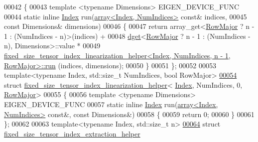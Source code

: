 \begin{DoxyCode}
00042 \{
00043   \textcolor{keyword}{template} <\textcolor{keyword}{typename} Dimensions> EIGEN\_DEVICE\_FUNC
00044   \textcolor{keyword}{static} \textcolor{keyword}{inline} \hyperlink{namespace_eigen_a62e77e0933482dafde8fe197d9a2cfde}{Index} run(\hyperlink{class_eigen_1_1array}{array<Index, NumIndices>} \textcolor{keyword}{const}& indices,
00045                           \textcolor{keyword}{const} Dimensions& dimensions)
00046   \{
00047     \textcolor{keywordflow}{return} array\_get<\hyperlink{group__enums_ggaacded1a18ae58b0f554751f6cdf9eb13acfcde9cd8677c5f7caf6bd603666aae3}{RowMajor} ? n - 1 : (NumIndices - n)>(indices) +
00048         \hyperlink{struct_eigen_1_1internal_1_1dget}{dget}<\hyperlink{group__enums_ggaacded1a18ae58b0f554751f6cdf9eb13acfcde9cd8677c5f7caf6bd603666aae3}{RowMajor} ? n - 1 : (NumIndices - n), Dimensions>::value *
00049         
      \hyperlink{struct_eigen_1_1internal_1_1fixed__size__tensor__index__linearization__helper}{fixed\_size\_tensor\_index\_linearization\_helper<Index, NumIndices, n - 1, RowMajor>::run}
      (indices, dimensions);
00050   \}
00051 \};
00052 
00053 \textcolor{keyword}{template}<\textcolor{keyword}{typename} Index, std::\textcolor{keywordtype}{size\_t} NumIndices, \textcolor{keywordtype}{bool} RowMajor>
\hyperlink{struct_eigen_1_1internal_1_1fixed__size__tensor__index__linearization__helper_3_01_index_00_01_n48be286421c8b3a07bb17ebfc895db83}{00054} \textcolor{keyword}{struct }\hyperlink{struct_eigen_1_1internal_1_1fixed__size__tensor__index__linearization__helper}{fixed\_size\_tensor\_index\_linearization\_helper}<
      \hyperlink{namespace_eigen_a62e77e0933482dafde8fe197d9a2cfde}{Index}, NumIndices, 0, \hyperlink{group__enums_ggaacded1a18ae58b0f554751f6cdf9eb13acfcde9cd8677c5f7caf6bd603666aae3}{RowMajor}>
00055 \{
00056   \textcolor{keyword}{template} <\textcolor{keyword}{typename} Dimensions> EIGEN\_DEVICE\_FUNC
00057   \textcolor{keyword}{static} \textcolor{keyword}{inline} \hyperlink{namespace_eigen_a62e77e0933482dafde8fe197d9a2cfde}{Index} run(\hyperlink{class_eigen_1_1array}{array<Index, NumIndices>} \textcolor{keyword}{const}&, \textcolor{keyword}{const} Dimensions&)
00058   \{
00059     \textcolor{keywordflow}{return} 0;
00060   \}
00061 \};
00062 
00063 \textcolor{keyword}{template}<\textcolor{keyword}{typename} Index, std::\textcolor{keywordtype}{size\_t} n>
\hyperlink{struct_eigen_1_1internal_1_1fixed__size__tensor__index__extraction__helper}{00064} \textcolor{keyword}{struct }\hyperlink{struct_eigen_1_1internal_1_1fixed__size__tensor__index__extraction__helper}{fixed\_size\_tensor\_index\_extraction\_helper}

\end{DoxyCode}
